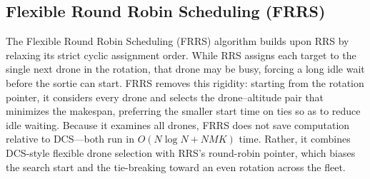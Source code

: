 \documentclass[subscriptcorrection,upint,nolists, varvw,barcolor=Goldenrod3,mathalfa=cal=euler,balance,hyphenate,french]{asmejour} %
\begin{document}





\iffalse

\subsection{Flexible Round Robin Scheduling (FRRS)}
The Flexible Round Robin Scheduling (FRRS) algorithm builds upon RRS by relaxing its strict cyclic assignment order.
While RRS assigns each target to the single next drone in the rotation, that drone may be busy, forcing a long idle wait before the sortie can start.
FRRS removes this rigidity: starting from the rotation pointer, it considers every drone and selects the drone--altitude pair that minimizes the makespan, preferring the smaller start time on ties so as to reduce idle waiting.
Because it examines all drones, FRRS does not save computation relative to DCS---both run in $O(N\log N + NMK)$ time. Rather, it combines DCS-style flexible drone selection with RRS's round-robin pointer, which biases the search start and the tie-breaking toward an even rotation across the fleet.
\end{document}

